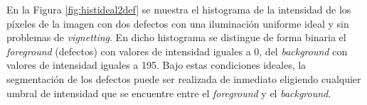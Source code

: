 	\begin{figure}[H]
		\begin{floatrow}
		\end{floatrow}
	\end{figure}

En la Figura \ref{fig:histideal2def} se muestra el histograma de la intensidad de los píxeles de la imagen con dos defectos con una iluminación uniforme ideal y sin problemas de \textit{vignetting}. En dicho histograma se distingue de forma binaria el \textit{foreground} (defectos) con valores de intensidad iguales a 0, del \textit{background} con valores de intensidad iguales a 195. Bajo estas condiciones ideales, la segmentación de los defectos puede ser realizada de inmediato eligiendo cualquier umbral de intensidad que se encuentre entre el \textit{foreground} y el \textit{background}. 

